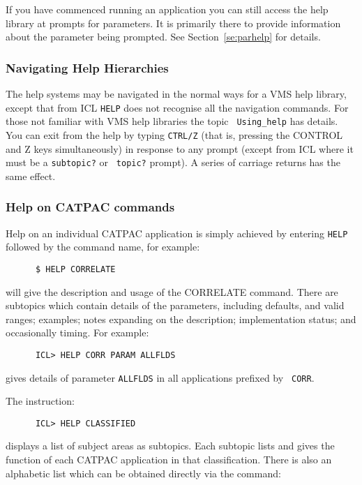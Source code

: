 If you have commenced running an application you can still access the help
library at prompts for parameters.  It is primarily there to provide
information about the parameter being prompted. See Section~\ref{se:parhelp}
for details. 

\subsubsection{Navigating Help Hierarchies}

The help systems may be navigated in the normal ways for a VMS help library,
except that from {\small ICL} {\tt HELP} does not recognise all the navigation
commands. For those not familiar with VMS help libraries the topic {\tt
Using\_help} has details. You can exit from the help by typing {\tt CTRL/Z}
(that is, pressing the CONTROL and Z keys simultaneously) in response to any
prompt (except from {\small ICL} where it must be a {\tt subtopic?} or {\tt
topic?} prompt).  A series of carriage returns has the same effect. 

\subsubsection{Help on CATPAC commands}

Help on an individual {\small CATPAC} application is simply achieved by
entering {\tt HELP} followed by the command name, for example: 

\begin{verbatim}
      $ HELP CORRELATE
\end{verbatim}

will give the description and usage of the CORRELATE command.  There are
subtopics which contain details of the parameters, including defaults, and
valid ranges; examples; notes expanding on the description; implementation
status; and occasionally timing. For example:

\begin{verbatim}
      ICL> HELP CORR PARAM ALLFLDS
\end{verbatim}

gives details of parameter {\tt ALLFLDS} in all applications prefixed by {\tt
CORR}. 

The instruction:

\begin{verbatim}
      ICL> HELP CLASSIFIED
\end{verbatim}

displays a list of subject areas as subtopics.  Each subtopic lists and gives
the function of each {\small CATPAC} application in that classification. There
is also an alphabetic list which can be obtained directly via the command:

